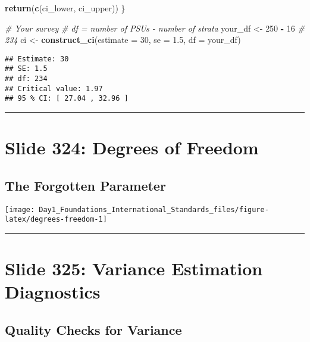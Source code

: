 \documentclass[
]{article}
\newenvironment{Shaded}{\begin{snugshade}}{\end{snugshade}}
\newcommand{\AttributeTok}[1]{\textcolor[rgb]{0.13,0.29,0.53}{#1}}
\newcommand{\CommentTok}[1]{\textcolor[rgb]{0.56,0.35,0.01}{\textit{#1}}}
\newcommand{\DecValTok}[1]{\textcolor[rgb]{0.00,0.00,0.81}{#1}}
\newcommand{\FloatTok}[1]{\textcolor[rgb]{0.00,0.00,0.81}{#1}}
\newcommand{\FunctionTok}[1]{\textcolor[rgb]{0.13,0.29,0.53}{\textbf{#1}}}
\newcommand{\NormalTok}[1]{#1}
\newcommand{\OtherTok}[1]{\textcolor[rgb]{0.56,0.35,0.01}{#1}}
\newcommand{\SpecialCharTok}[1]{\textcolor[rgb]{0.81,0.36,0.00}{\textbf{#1}}}
\begin{document}
\begin{Shaded}
\begin{Highlighting}[]
  \FunctionTok{return}\NormalTok{(}\FunctionTok{c}\NormalTok{(ci\_lower, ci\_upper))}
\NormalTok{\}}

\CommentTok{\# Your survey}
\CommentTok{\# df = number of PSUs {-} number of strata}
\NormalTok{your\_df }\OtherTok{\textless{}{-}} \DecValTok{250} \SpecialCharTok{{-}} \DecValTok{16}  \CommentTok{\# 234}
\NormalTok{ci }\OtherTok{\textless{}{-}} \FunctionTok{construct\_ci}\NormalTok{(}\AttributeTok{estimate =} \DecValTok{30}\NormalTok{, }\AttributeTok{se =} \FloatTok{1.5}\NormalTok{, }\AttributeTok{df =}\NormalTok{ your\_df)}
\end{Highlighting}
\end{Shaded}

\begin{verbatim}
## Estimate: 30 
## SE: 1.5 
## df: 234 
## Critical value: 1.97 
## 95 % CI: [ 27.04 , 32.96 ]
\end{verbatim}

\begin{center}\rule{0.5\linewidth}{0.5pt}\end{center}

\section{Slide 324: Degrees of
Freedom}\label{slide-324-degrees-of-freedom}

\subsection{The Forgotten Parameter}\label{the-forgotten-parameter}

\texttt{[image: Day1\_Foundations\_International\_Standards\_files/figure-latex/degrees-freedom-1]}

\begin{center}\rule{0.5\linewidth}{0.5pt}\end{center}

\section{Slide 325: Variance Estimation
Diagnostics}\label{slide-325-variance-estimation-diagnostics}

\subsection{Quality Checks for
Variance}\label{quality-checks-for-variance}
\end{document}
